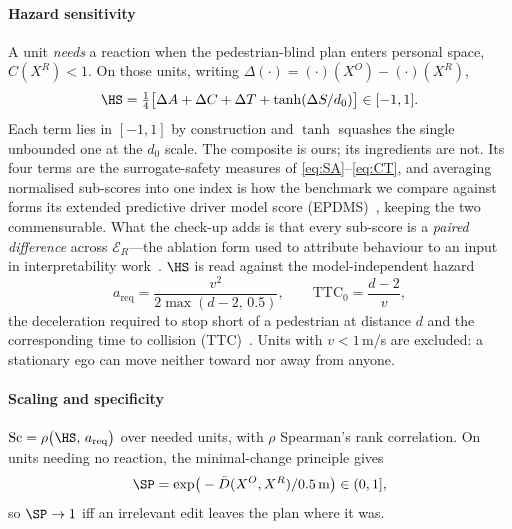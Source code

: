 \paragraph{Hazard sensitivity}
A unit \emph{needs} a reaction when the pedestrian-blind plan enters personal space, $C(X^{R})<1$. On
those units, writing $\Delta(\cdot)=(\cdot)(X^{O})-(\cdot)(X^{R})$,
\begin{equation}
\HS=\tfrac14\big[\Delta A+\Delta C+\Delta T+\tanh(\Delta S/d_0)\big]\in[-1,1].
\label{eq:hs}
\end{equation}
Each term lies in $[-1,1]$ by construction and $\tanh$ squashes the single unbounded one at the $d_0$
scale. The composite is ours; its ingredients are not. Its four terms are the surrogate-safety
measures of \eqref{eq:SA}--\eqref{eq:CT}, and averaging normalised sub-scores into one index is how
the benchmark we compare against forms its extended predictive driver model score (EPDMS)~\cite{dauner2024navsim}, keeping the two commensurable.
What the check-up adds is that every sub-score is a \emph{paired difference} across
$\mathcal{E}_R$---the ablation form used to attribute behaviour to an input in interpretability
work~\cite{zou2023repe,hase2023localization}. $\HS$ is read against the model-independent hazard
\begin{equation}
a_{\mathrm{req}}=\frac{v^{2}}{2\max(d-2,\,0.5)},\qquad \mathrm{TTC}_0=\frac{d-2}{v},
\label{eq:hazard}
\end{equation}
the deceleration required to stop short of a pedestrian at distance $d$ and the corresponding
time to collision (TTC)~\cite{gettman2003surrogate,hayward1972near}. Units with $v<1$\,m/s are excluded: a
stationary ego can move neither toward nor away from anyone.

\paragraph{Scaling and specificity}
$\mathrm{Sc}=\rho\big(\HS,\,a_{\mathrm{req}}\big)$ over needed units, with $\rho$ Spearman's rank
correlation. On units needing no reaction, the minimal-change principle gives
\begin{equation}
\SP=\exp\!\big(-\bar D(X^{O},X^{R})/0.5\,\mathrm{m}\big)\in(0,1],
\label{eq:sp}
\end{equation}
so $\SP\to1$ iff an irrelevant edit leaves the plan where it was.

